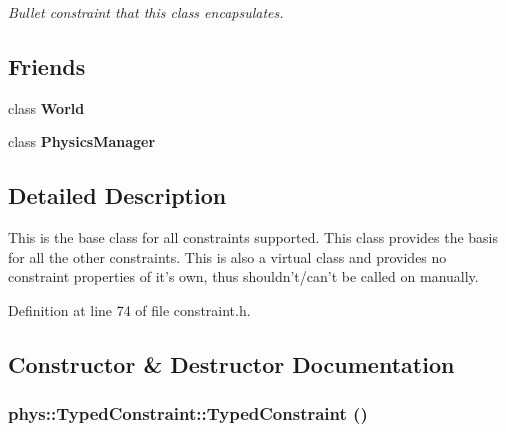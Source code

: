 \begin{DoxyCompactItemize}
\begin{DoxyCompactList}\small\item\em Bullet constraint that this class encapsulates. \item\end{DoxyCompactList}\end{DoxyCompactItemize}
\subsection*{Friends}
\begin{DoxyCompactItemize}
\item 
\hypertarget{classphys_1_1TypedConstraint_a7b4bcdf992c21ae83363f25df05b1d25}{
class {\bfseries World}}
\label{d1/d17/classphys_1_1TypedConstraint_a7b4bcdf992c21ae83363f25df05b1d25}

\item 
\hypertarget{classphys_1_1TypedConstraint_a139cf05ac01161b7071c8a037c841683}{
class {\bfseries PhysicsManager}}
\label{d1/d17/classphys_1_1TypedConstraint_a139cf05ac01161b7071c8a037c841683}

\end{DoxyCompactItemize}


\subsection{Detailed Description}
This is the base class for all constraints supported. This class provides the basis for all the other constraints. This is also a virtual class and provides no constraint properties of it's own, thus shouldn't/can't be called on manually. 

Definition at line 74 of file constraint.h.



\subsection{Constructor \& Destructor Documentation}
\hypertarget{classphys_1_1TypedConstraint_a499e2f94ca4ee111001efa0dd3862391}{
\subsubsection[{TypedConstraint}]{\setlength{\rightskip}{0pt plus 5cm}phys::TypedConstraint::TypedConstraint ()}}
\label{d1/d17/classphys_1_1TypedConstraint_a499e2f94ca4ee111001efa0dd3862391}


